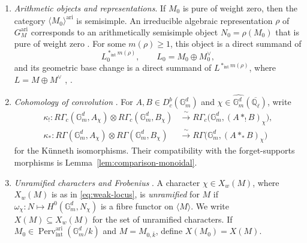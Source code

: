 \documentclass[12pt,reqno]{amsart}
\theoremstyle{definition}
\theoremstyle{plain}
\theoremstyle{definition}
\theoremstyle{remark}
\newcommand{\bbG}{\mathbb{G}}  \newcommand{\bbH}{\mathbb{H}}
\newcommand{\bbQ}{\mathbb{Q}}  \newcommand{\bbR}{\mathbb{R}}
\newcommand{\ol}[1]{\overline{#1}}
\newcommand{\Ql}{\bbQ_{\ell}}
\newcommand{\Db}{D^b_c}
\newcommand{\Gm}{\bbG_m}
\newcommand{\Perv}{\operatorname{Perv}}
\begin{document}
\begin{enumerate}[label=\textup{(T\arabic*)}, ref=\textup{(T\arabic*)}]
\item\label{item:T3} \emph{Arithmetic objects and representations}.  If \(M_0\) is pure of weight
zero, then the category
\(\langle M_0\rangle^{\mathrm{ari}}\) is semisimple.  An irreducible algebraic representation \(\rho\)
of \(G^{\mathrm{ari}}_M\) corresponds to an arithmetically semisimple object \(N_0=\rho(M_0)\) that is
pure of weight zero \cite[Th.~3.30 and Th.~3.33]{ForeyFresanKowalski2021}.
For some \(m(\rho)\ge1\), this object is a direct summand of
\[
        L_0^{\ast_{\mathrm{int}}m(\rho)},
        \qquad
        L_0=M_0\oplus M_0^\vee,
\]
and its geometric base change is a direct summand of
\(L^{\ast_{\mathrm{int}}m(\rho)}\), where \(L=M\oplus M^\vee\)
\cite[Prop.~3.1]{Del82}, \cite[Cor.~3.19]{ForeyFresanKowalski2021}.

\item\label{item:T4} \emph{Cohomology of convolution} \cite[Lem.~1.15]{ForeyFresanKowalski2021}.
For \(A,B\in\Db(\Gm^d)\) and \(\chi\in\widehat{\Gm^d}(\ol\Ql)\), write
\[
\begin{aligned}
 \kappa_!\colon
 R\Gamma_c(\Gm^d,A_\chi)\otimes R\Gamma_c(\Gm^d,B_\chi)
   &\xrightarrow{\ \sim\ } R\Gamma_c\bigl(\Gm^d,(A\ast_!B)_\chi\bigr),\\
 \kappa_*\colon
 R\Gamma(\Gm^d,A_\chi)\otimes R\Gamma(\Gm^d,B_\chi)
   &\xrightarrow{\ \sim\ } R\Gamma\bigl(\Gm^d,(A\ast_*B)_\chi\bigr)
\end{aligned}
\]
for the K\"unneth isomorphisms.  Their compatibility with the forget-supports morphisms is
Lemma~\ref{lem:comparison-monoidal}.

\item\label{item:T5} \emph{Unramified characters and Frobenius}
\cite[Def.~3.25, Lem.~3.28, \S\S3.8--3.9]{ForeyFresanKowalski2021}.  A character
\(\chi\in X_w(M)\), where \(X_w(M)\) is as in \eqref{eq:weak-locus}, is \emph{unramified} for \(M\) if
\(\omega_\chi:N\mapsto H^0(\Gm^d,N_\chi)\) is a fibre functor on \(\langle M\rangle\).  We write
\(X(M)\subseteq X_w(M)\) for the set of unramified characters.  If
\(M_0\in\Perv_{\mathrm{int}}^{\mathrm{ari}}(\Gm^d/k)\) and \(M=M_{0,\bar k}\), define
\(X(M_0)=X(M)\).


\end{enumerate}
\end{document}
